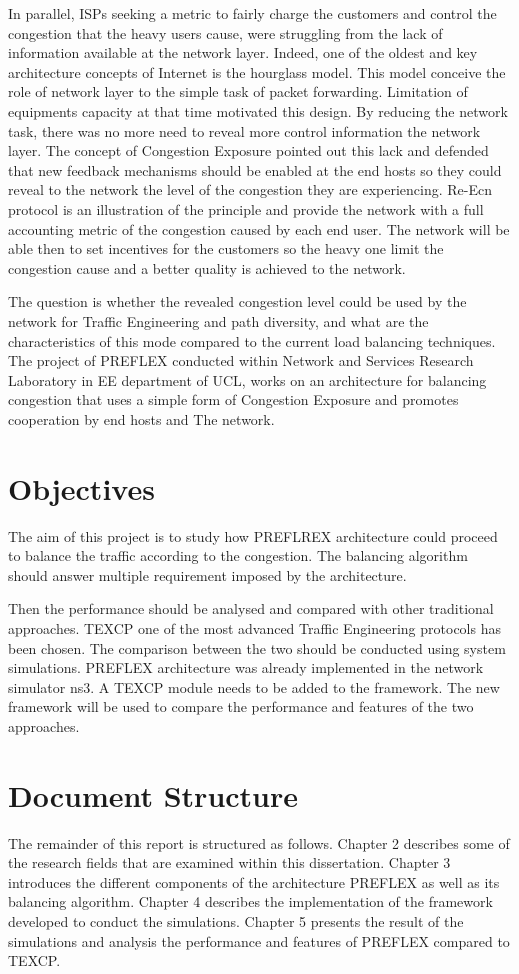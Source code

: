 In parallel, ISPs seeking a metric to fairly charge the customers and control the congestion that the heavy users cause, were struggling from the lack of information available at the network layer. Indeed, one of the oldest and key architecture concepts of Internet is the hourglass model. This model conceive the role of network layer to the simple task of packet forwarding. Limitation of equipments capacity at that time motivated this design. By reducing the network task, there was no more need to reveal more control information the network layer. The concept of Congestion Exposure pointed out this lack and defended that new feedback mechanisms should be enabled at the end hosts so they could reveal to the network the level of the congestion they are experiencing. Re-Ecn protocol is an illustration of the principle and provide the network with a full accounting metric of the congestion caused by each end user. The network will be able then to set incentives for the customers so the heavy one limit the congestion cause and a better quality is achieved to the network.

The question is whether the revealed congestion level could be used by the network for Traffic Engineering and path diversity, and what are the characteristics of this mode compared to the current load balancing techniques. The project of PREFLEX  conducted within Network and Services Research Laboratory in EE department of UCL, works on an architecture for balancing congestion that uses a simple form of Congestion Exposure and promotes cooperation by end hosts and The network.

\section{Objectives}

The aim of this project is to study how PREFLREX architecture could proceed to balance the traffic according to the congestion. The balancing algorithm should answer multiple requirement imposed by the architecture. 

Then the performance should be analysed and compared with other traditional approaches. TEXCP one of the most advanced Traffic Engineering protocols has been chosen. The comparison between the two should be conducted using system simulations. PREFLEX architecture was already implemented in the network simulator ns3. A TEXCP module needs to be added to the framework.
The new framework will be used to compare the performance and features of the two approaches.

\section{Document Structure}

The remainder of this report is structured as follows. Chapter 2 describes some of the research fields that are examined within this dissertation. Chapter 3 introduces the different components of the architecture PREFLEX as well as its balancing algorithm. Chapter 4 describes the implementation of the framework  developed to conduct the simulations. Chapter 5 presents the result of the simulations and analysis the performance and features of PREFLEX  compared to TEXCP.